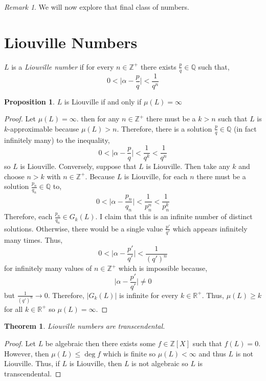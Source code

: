 \documentclass{article}
\newcommand{\Z}{\mathbb{Z}}
\newcommand{\Zplus}{\mathbb{Z}^{+}}
\newcommand{\Q}{\mathbb{Q}}
\newcommand{\Rplus}{\mathbb{R}^+}
\newenvironment{definition}[1][Definition:]{\begin{trivlist}
\item[\hskip \labelsep {\bfseries #1}]}{\end{trivlist}}
\theoremstyle{theorem}
\newtheorem{theorem}{Theorem}[section]
\theoremstyle{definition}
\theoremstyle{definition}
\newtheorem*{proposition}{Proposition}
\theoremstyle{remark}
\theoremstyle{definition}
\theoremstyle{remark}
\newtheorem{remark}{Remark}[subsection]
\begin{document}
\begin{remark}
We will now explore that final class of numbers. 
\end{remark}

\section{Liouville Numbers} 

\begin{definition}
$L$ is a \textit{Liouville number} if for every $n \in \Zplus$ there exists $\frac{p}{q}  \in \Q$ such that,
\[ 0 < \Big| \alpha - \frac{p}{q} \Big| < \frac{1}{q^n} \]
\end{definition}

\begin{proposition}
$L$ is Liouville if and only if $\mu(L) = \infty$
\end{proposition}

\begin{proof}
Let $\mu(L) = \infty$. then for any $n \in \Zplus$ there must be a $k > n$ such that $L$ is $k$-approximable because $\mu(L) > n$. Therefore, there is a solution $\frac{p}{q} \in \Q$ (in fact infinitely many) to the inequality,
\[0 < \Big| \alpha - \frac{p}{q} \Big| < \frac{1}{q^k} < \frac{1}{q^n}\] 
so $L$ is Liouville. Conversely, suppose that $L$ is Liouville. Then take any $k$ and choose $n > k$ with $n \in \Zplus$. Because $L$ is Liouville, for each $n$ there must be a solution $\frac{p_n}{q_n} \in \Q$ to,
\[0 < \Big| \alpha - \frac{p_n}{q_n} \Big| < \frac{1}{p_n^n} < \frac{1}{p_n^k}\]
Therefore, each $\frac{p_n}{q_n} \in G_k(L)$. I claim that this is an infinite number of distinct solutions. Otherwise, there would be a single value $\frac{p'}{q'}$ which appears infinitely many times. Thus,  
\[0 < \Big| \alpha - \frac{p'}{q'} \Big| < \frac{1}{(q')^n}\]
for infinitely many values of $n \in \Zplus$ which is impossible because,
\[\Big| \alpha - \frac{p'}{q'} \Big| \neq 0\]
but $\frac{1}{(q')^n} \to 0$. Therefore, $|G_k(L)|$ is infinite for every $k \in \Rplus$. Thus, $\mu(L) \ge k$ for all $k \in \Rplus$ so $\mu(L) = \infty$.
\end{proof}

\begin{theorem}
Liouville numbers are transcendental. 
\end{theorem}

\begin{proof}
Let $L$ be algebraic then there exists some $f \in \Z[X]$ such that $f(L) = 0$. However, then $\mu(L) \le \deg{f}$ which is finite so $\mu(L) < \infty$ and thus $L$ is not Liouville. Thus, if $L$ is Liouville, then $L$ is not algebraic so $L$ is transcendental.
\end{proof}
\end{document}
